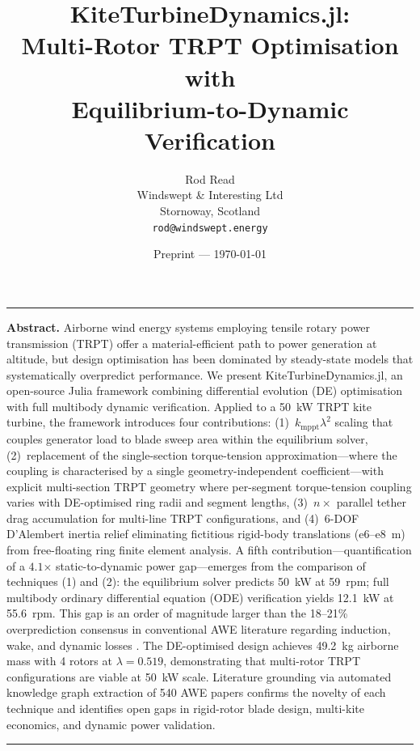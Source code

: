 \documentclass[11pt,a4paper]{article}
\renewenvironment{abstract}
 {\small\noindent\rule{\linewidth}{0.4pt}\par\medskip\textbf{Abstract.}\quad}
 {\par\medskip\rule{\linewidth}{0.4pt}}
\begin{document}
\title{\bfseries KiteTurbineDynamics.jl:\\[4pt]
       Multi-Rotor TRPT Optimisation with\\Equilibrium-to-Dynamic Verification}
\author{Rod Read\\[2pt]
        \small Windswept \& Interesting Ltd\\[2pt]
        \small Stornoway, Scotland\\[2pt]
        \small \texttt{rod@windswept.energy}}
\date{Preprint — \today}
\maketitle

\begin{abstract}
Airborne wind energy systems employing tensile rotary power transmission (TRPT) offer a material-efficient path to power generation at altitude, but design optimisation has been dominated by steady-state models that systematically overpredict performance. We present KiteTurbineDynamics.jl, an open-source Julia framework combining differential evolution (DE) optimisation with full multibody dynamic verification. Applied to a 50~kW TRPT kite turbine, the framework introduces four contributions: (1)~$k_{\mathrm{mppt}} \lambda^2$ scaling that couples generator load to blade sweep area within the equilibrium solver, (2)~replacement of the single-section torque-tension approximation—where the coupling is characterised by a single geometry-independent coefficient—with explicit multi-section TRPT geometry where per-segment torque-tension coupling varies with DE-optimised ring radii and segment lengths, (3)~$n\times$ parallel tether drag accumulation for multi-line TRPT configurations, and (4)~6-DOF D'Alembert inertia relief eliminating fictitious rigid-body translations (e6--e8~m) from free-floating ring finite element analysis. A fifth contribution—quantification of a $4.1$$\times$ static-to-dynamic power gap—emerges from the comparison of techniques (1) and (2): the equilibrium solver predicts 50~kW at 59~rpm; full multibody ordinary differential equation (ODE) verification yields 12.1~kW at 55.6~rpm. This gap is an order of magnitude larger than the 18--21\% overprediction consensus in conventional AWE literature regarding induction, wake, and dynamic losses \cite{kheiri2018,leuthold2019,carceller2022,pfister2020}. The DE-optimised design achieves 49.2~kg airborne mass with 4 rotors at $\lambda = 0.519$, demonstrating that multi-rotor TRPT configurations are viable at 50~kW scale. Literature grounding via automated knowledge graph extraction of 540 AWE papers confirms the novelty of each technique and identifies open gaps in rigid-rotor blade design, multi-kite economics, and dynamic power validation.
\end{abstract}
\end{document}
